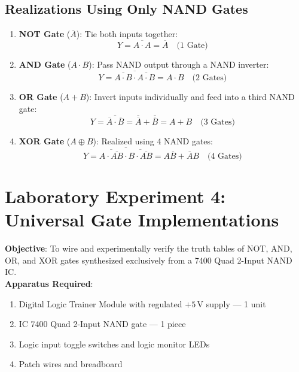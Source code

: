\subsection{Realizations Using Only NAND Gates}
\begin{enumerate}
    \item \textbf{NOT Gate} ($\overline{A}$): Tie both inputs together:
    \[ Y = \overline{A \cdot A} = \overline{A} \quad \text{(1 Gate)} \]
    \item \textbf{AND Gate} ($A \cdot B$): Pass NAND output through a NAND inverter:
    \[ Y = \overline{\overline{A \cdot B} \cdot \overline{A \cdot B}} = A \cdot B \quad \text{(2 Gates)} \]
    \item \textbf{OR Gate} ($A + B$): Invert inputs individually and feed into a third NAND gate:
    \[ Y = \overline{\overline{A} \cdot \overline{B}} = \overline{\overline{A}} + \overline{\overline{B}} = A + B \quad \text{(3 Gates)} \]
    \item \textbf{XOR Gate} ($A \oplus B$): Realized using 4 NAND gates:
    \[ Y = \overline{\overline{A \cdot \overline{AB}} \cdot \overline{B \cdot \overline{AB}}} = A\overline{B} + \overline{A}B \quad \text{(4 Gates)} \]
\end{enumerate}

\section{Laboratory Experiment 4: Universal Gate Implementations}
\begin{experimentbox}
\textbf{Objective}: To wire and experimentally verify the truth tables of NOT, AND, OR, and XOR gates synthesized exclusively from a 7400 Quad 2-Input NAND IC.\\
\textbf{Apparatus Required}:
\begin{enumerate}
    \item Digital Logic Trainer Module with regulated $+5\,\mathrm{V}$ supply --- 1 unit
    \item IC 7400 Quad 2-Input NAND gate --- 1 piece
    \item Logic input toggle switches and logic monitor LEDs
    \item Patch wires and breadboard
\end{enumerate}
\end{experimentbox}

